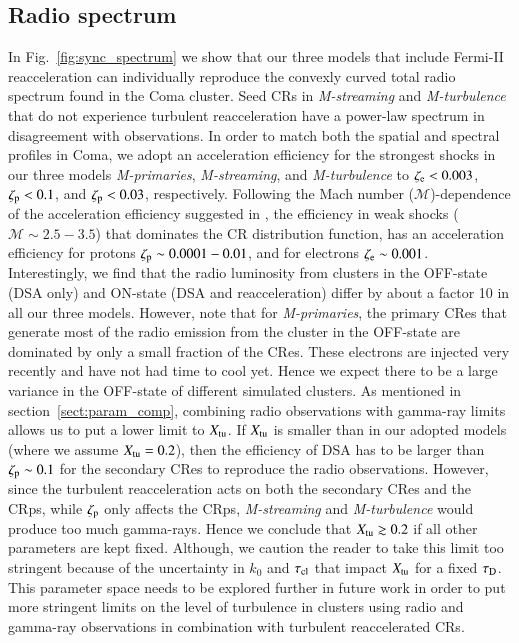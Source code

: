 \documentclass[fleqn,usenatbib,useAMS]{mnras}
\newcommand{\Mstream}{{\it M-streaming}\xspace}
\newcommand{\Mflatturb}{{\it M-turbulence}\xspace}
\newcommand{\Mprimary}{{\it M-primaries}\xspace}
\begin{document}
\subsection{Radio spectrum}
\label{sect:radio_spec}
In Fig.~\ref{fig:sync_spectrum} we show that our three models that
include Fermi-II reacceleration can individually reproduce the
convexly curved total radio spectrum found in the Coma cluster. Seed
CRs in \Mstream and \Mflatturb that do not experience turbulent
reacceleration have a power-law spectrum in disagreement with
observations. In order to match both the spatial and spectral profiles
in Coma, we adopt an acceleration efficiency for the strongest shocks
in our three models \Mprimary, \Mstream, and \Mflatturb to
$\zeta_{{\mathrm{e}}} <0.003$, $\zeta_{{\mathrm{p}}} < 0.1$, and
$\zeta_{{\mathrm{p}}}<0.03$, respectively. Following the Mach number
($\mathcal{M}$)-dependence of the acceleration efficiency suggested in
\cite{pinzke13}, the efficiency in weak shocks ($\mathcal{M}\sim
2.5-3.5$) that dominates the CR distribution function, has an
acceleration efficiency for protons $\zeta_{{\mathrm{p}}}\sim0.0001-0.01$,
and for electrons $\zeta_{{\mathrm{e}}}\sim 0.001$. Interestingly, we find
that the radio luminosity from clusters in the OFF-state (DSA only)
and ON-state (DSA and reacceleration) differ by about a factor 10 in
all our three models. However, note that for \Mprimary, the primary
CRes that generate most of the radio emission from the cluster in the
OFF-state are dominated by only a small fraction of the CRes. These
electrons are injected very recently and have not had time to cool
yet. Hence we expect there to be a large variance in the OFF-state of
different simulated clusters. As mentioned in
section~\ref{sect:param_comp}, combining radio observations with
gamma-ray limits allows us to put a lower limit to $X_{\mathrm{tu}}$.  If
$X_{\mathrm{tu}}$ is smaller than in our adopted models (where we assume
$X_{\mathrm{tu}}=0.2$), then the efficiency of DSA has to be larger than
$\zeta_{\mathrm{p}}\sim 0.1$ for the secondary CRes to reproduce the radio
observations. However, since the turbulent reacceleration acts on both
the secondary CRes and the CRps, while $\zeta_{\mathrm{p}}$ only affects
the CRps, \Mstream and \Mflatturb would produce too much
gamma-rays. Hence we conclude that $X_{\mathrm{tu}}\gtrsim0.2$ if all other
parameters are kept fixed. Although, we caution the reader to take
this limit too stringent because of the uncertainty in $k_0$ and
$\tau_{\mathrm{cl}}$ that impact $X_{\mathrm{tu}}$ for a fixed
$\tau_{\mathrm{D}}$. This parameter space needs to be explored further in
future work in order to put more stringent limits on the level of
turbulence in clusters using radio and gamma-ray observations in
combination with turbulent reaccelerated CRs.
\end{document}

